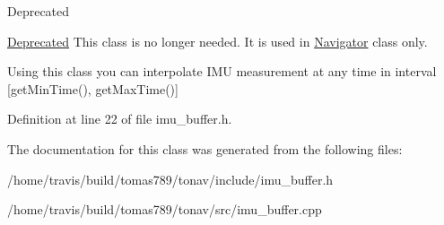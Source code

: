 \begin{DoxyRefDesc}{Deprecated}
\item[\hyperlink{deprecated__deprecated000002}{Deprecated}]This class is no longer needed. It is used in \hyperlink{class_navigator}{Navigator} class only.\end{DoxyRefDesc}


Using this class you can interpolate I\-M\-U measurement at any time in interval \mbox{[}get\-Min\-Time(), get\-Max\-Time()\mbox{]} 

Definition at line 22 of file imu\-\_\-buffer.\-h.



The documentation for this class was generated from the following files\-:\begin{DoxyCompactItemize}
\item 
/home/travis/build/tomas789/tonav/include/imu\-\_\-buffer.\-h\item 
/home/travis/build/tomas789/tonav/src/imu\-\_\-buffer.\-cpp\end{DoxyCompactItemize}

